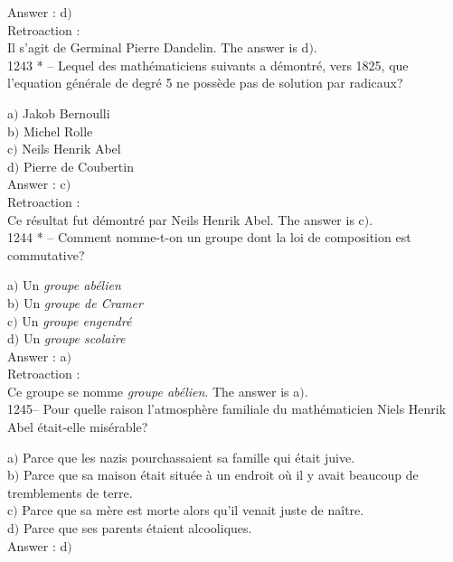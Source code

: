 ﻿\documentclass[letterpaper, 12pt]{article}
\begin{document}
Answer : d$)$\\

Retroaction : \\
Il s'agit de Germinal Pierre Dandelin.
The answer is d$)$.\\

1243 * -- Lequel des math\'ematiciens suivants a d\'emontr\'e, vers
1825, que l'equation g\'en\'erale de degr\'e 5 ne poss\`ede pas de
solution par radicaux?

a$)$ Jakob Bernoulli  \\
b$)$ Michel Rolle \\
c$)$ Neils Henrik Abel \\
d$)$ Pierre de Coubertin\\

Answer : c$)$\\

Retroaction : \\
Ce r\'esultat fut d\'emontr\'e par Neils Henrik Abel.
The answer is c$)$.\\

1244 * -- Comment nomme-t-on un groupe dont la loi de composition
est commutative?

a$)$ Un {\sl groupe ab\'elien}  \\
b$)$ Un {\sl groupe de Cramer} \\
c$)$ Un {\sl groupe engendr\'e} \\
d$)$ Un {\sl groupe scolaire}\\

Answer : a$)$\\

Retroaction : \\
Ce groupe se nomme {\sl groupe ab\'elien}.
The answer is a$)$.\\

1245-- Pour quelle raison l'atmosph\`ere familiale du
math\'ematicien Niels Henrik Abel \'etait-elle mis\'erable?

a$)$ Parce que les nazis pourchassaient sa famille qui \'etait juive. \\
b$)$ Parce que sa maison \'etait situ\'ee \`a un endroit o\`u il y avait
beaucoup de tremblements de terre. \\
c$)$ Parce que sa m\`ere est morte alors qu'il venait juste de na\^itre. \\
d$)$ Parce que ses parents \'etaient alcooliques.  \\

Answer : d$)$\\
\end{document}
